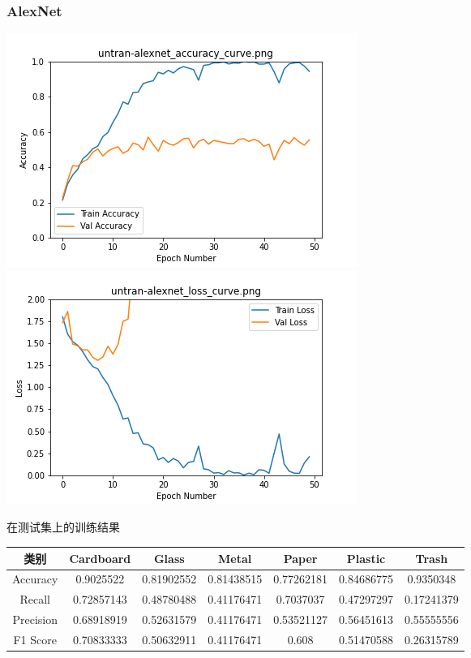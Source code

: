 \documentclass[UTF8]{ctexart}
\begin{document}
\subsubsection{AlexNet}
\includegraphics[scale=0.5]{image/untran-alexnet_accuracy_curve.png} 
\includegraphics[scale=0.5]{image/untran-alexnet_loss_curve.png} 

在测试集上的训练结果

\begin{tabular}{|c|c|c|c|c|c|c|}
\hline 
类别 & Cardboard & Glass & Metal & Paper & Plastic & Trash \\ 
\hline 
Accuracy &0.9025522 & 0.81902552 &0.81438515 &0.77262181& 0.84686775 &0.9350348 \\
 \hline 
Recall &0.72857143& 0.48780488& 0.41176471 &0.7037037 & 0.47297297 &0.17241379 \\ 
\hline 
Precision &0.68918919& 0.52631579& 0.41176471& 0.53521127 &0.56451613& 0.55555556 \\ 
\hline 
F1 Score &0.70833333& 0.50632911& 0.41176471& 0.608      &0.51470588 &0.26315789 \\ 
\hline 
\end{tabular} 
\end{document}
